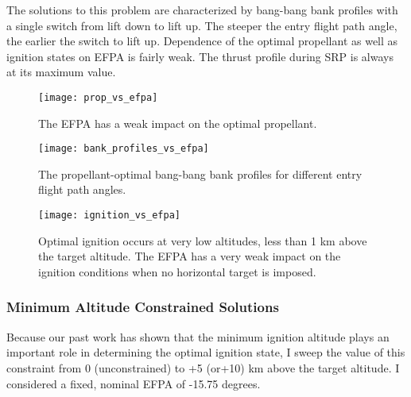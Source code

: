 \documentclass[]{article}
\begin{document}
The solutions to this problem are characterized by bang-bang bank profiles with a single switch from lift down to lift up. The steeper the entry flight path angle, the earlier the switch to lift up.  
Dependence of the optimal propellant as well as ignition states on EFPA is fairly weak. The thrust profile during SRP is always at its maximum value. 

\begin{figure}[h!]
	\centering
	\texttt{[image: prop\_vs\_efpa]}
	\caption{The EFPA has a weak impact on the optimal propellant.}
\end{figure}
\begin{figure}[h!]
	\centering
	\texttt{[image: bank\_profiles\_vs\_efpa]}
	\caption{The propellant-optimal bang-bang bank profiles for different entry flight path angles.}
\end{figure}
\begin{figure}[h!]
	\centering
	\texttt{[image: ignition\_vs\_efpa]}
	\caption{Optimal ignition occurs at very low altitudes, less than 1 km above the target altitude. The EFPA has a very weak impact on the ignition conditions when no horizontal target is imposed.}
\end{figure}

\subsubsection{Minimum Altitude Constrained Solutions}

Because our past work has shown that the minimum ignition altitude plays an important role in determining the optimal ignition state, I sweep the value of this constraint from 0 (unconstrained) to +5 (or+10) km above the target altitude. I considered a fixed, nominal EFPA of -15.75 degrees. 
\end{document}
